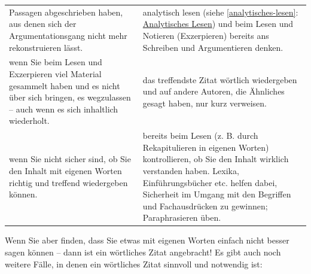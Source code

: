\documentclass[]{book}
\theoremstyle{definition}
\theoremstyle{definition}
\theoremstyle{definition}
\theoremstyle{remark}
\begin{document}
\begin{longtable}[]{@{}ll@{}}
\begin{minipage}[t]{0.40\columnwidth}
Passagen abgeschrieben haben, aus denen sich der Argumentationsgang
nicht mehr rekonstruieren lässt.\strut
\end{minipage} & \begin{minipage}[t]{0.54\columnwidth}\raggedright\strut
analytisch lesen (siehe \ref{analytisches-lesen}:
\protect\hyperlink{analytisches-lesen}{Analytisches Lesen}) und beim
Lesen und Notieren (Exzerpieren) bereits ans Schreiben und Argumentieren
denken. \vspace{-6mm}\strut
\end{minipage}\tabularnewline
\begin{minipage}[t]{0.40\columnwidth}\raggedright\strut
wenn Sie beim Lesen und Exzerpieren viel Material gesammelt haben und es
nicht über sich bringen, es wegzulassen -- auch wenn es sich inhaltlich
wiederholt.\strut
\end{minipage} & \begin{minipage}[t]{0.54\columnwidth}\raggedright\strut
das treffendste Zitat wörtlich wiedergeben und auf andere Autoren, die
Ähnliches gesagt haben, nur kurz verweisen. \vspace{-6mm}\strut
\end{minipage}\tabularnewline
\begin{minipage}[t]{0.40\columnwidth}\raggedright\strut
wenn Sie nicht sicher sind, ob Sie den Inhalt mit eigenen Worten richtig
und treffend wiedergeben können.\strut
\end{minipage} & \begin{minipage}[t]{0.54\columnwidth}\raggedright\strut
bereits beim Lesen (z. B. durch Rekapitulieren in eigenen Worten)
kontrollieren, ob Sie den Inhalt wirklich verstanden haben. Lexika,
Einführungsbücher etc. helfen dabei, Sicherheit im Umgang mit den
Begriffen und Fachausdrücken zu gewinnen; Paraphrasieren üben.\strut
\end{minipage}\tabularnewline
\bottomrule
\end{longtable}

Wenn Sie aber finden, dass Sie etwas mit eigenen Worten einfach nicht
besser sagen können -- dann ist ein wörtliches Zitat angebracht! Es gibt
auch noch weitere Fälle, in denen ein wörtliches Zitat sinnvoll und
notwendig ist:
\end{document}
